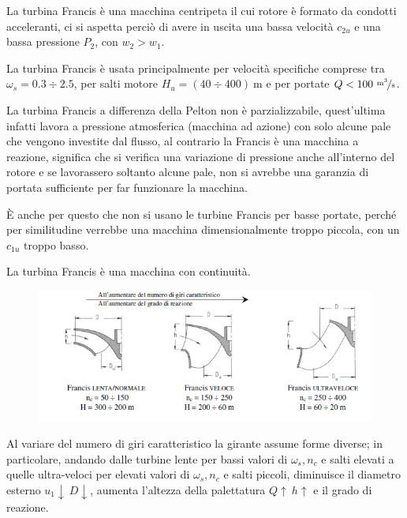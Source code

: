 \documentclass[a4paper, 15pt]{article}
\begin{document}
\begin{adjustwidth}{2in}{}
	La turbina Francis è una macchina centripeta il cui rotore è formato da condotti acceleranti, ci si aspetta perciò di avere in uscita una bassa velocità $c_{2u}$ e una bassa pressione $P_2$, con $w_2>w_1$. 
	
	La turbina Francis è usata principalmente per velocità specifiche comprese tra $\omega_s = 0.3\div2.5$, per salti motore $H_u=(40\div400)~\text{m}$ e per portate $Q<100~\nicefrac{\text{m}^3}{\text{s}}$. \newline 
	
	La turbina Francis a differenza della Pelton non è parzializzabile, quest'ultima infatti lavora a pressione atmosferica (macchina ad azione) con solo alcune pale che vengono investite dal flusso, al contrario la Francis è una macchina a reazione, significa che si verifica una variazione di pressione anche all'interno del rotore e se lavorassero soltanto alcune pale, non si avrebbe una garanzia di portata sufficiente per far funzionare la macchina. 
	
	È anche per questo che non si usano le turbine Francis per basse portate, perché per similitudine verrebbe una macchina dimensionalmente troppo piccola, con un $c_{1u}$ troppo basso. \newline 
	
	La turbina Francis è una macchina con continuità.
\begin{figure}[H]
	\centering
	\includegraphics[width=0.7\linewidth]{immagini/turbinafrancis3}
	\label{fig:turbinafrancis3}
\end{figure}
	Al variare del numero di giri caratteristico la girante assume forme diverse; in particolare, andando
	dalle turbine lente per bassi valori di $\omega_s, n_c$ e salti elevati a quelle ultra-veloci per elevati valori di $\omega_s, n_c$  e salti piccoli, diminuisce il diametro esterno $u_1\downarrow~D\downarrow$, aumenta l'altezza della palettatura $Q\uparrow~h\uparrow$ e il grado di reazione.	
\end{adjustwidth}
\end{document}
